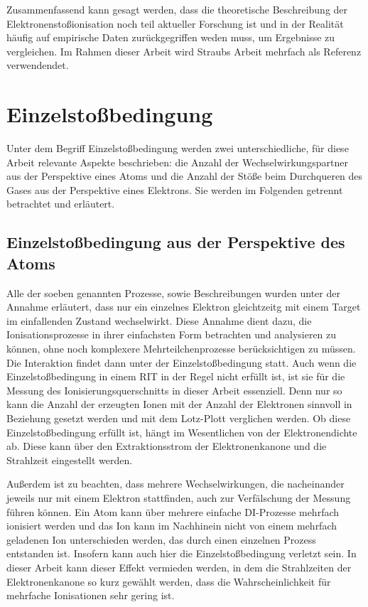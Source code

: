 Zusammenfassend kann gesagt werden, dass die theoretische Beschreibung der Elektronenstoßionisation noch teil aktueller Forschung ist und in der Realität häufig auf empirische Daten zurückgegriffen weden muss, um Ergebnisse zu vergleichen. Im Rahmen dieser Arbeit wird Straubs Arbeit \cite{Straub} mehrfach als Referenz verwendendet. 

\section{Einzelstoßbedingung}
\label{chap:Einzelstoß}
Unter dem Begriff Einzelstoßbedingung werden zwei unterschiedliche, für diese Arbeit relevante Aspekte beschrieben: die Anzahl der Wechselwirkungspartner aus der Perspektive eines Atoms und die Anzahl der Stöße beim Durchqueren des Gases aus der Perspektive eines Elektrons. Sie werden im Folgenden getrennt betrachtet und erläutert.

\subsection{Einzelstoßbedingung aus der Perspektive des Atoms}
Alle der soeben genannten Prozesse, sowie Beschreibungen wurden unter der Annahme erläutert, dass nur ein einzelnes Elektron gleichtzeitg mit einem Target im einfallenden Zustand wechselwirkt. Diese Annahme dient dazu, die Ionisationsprozesse in ihrer einfachsten Form betrachten und analysieren zu können, ohne noch komplexere Mehrteilchenprozesse berücksichtigen zu müssen. Die Interaktion findet dann unter der Einzelstoßbedingung statt. Auch wenn die Einzelstoßbedingung in einem RIT in der Regel nicht erfüllt ist, ist sie für die Messung des Ionisierungsquerschnitts in dieser Arbeit essenziell. Denn nur so kann die Anzahl der erzeugten Ionen mit der Anzahl der Elektronen sinnvoll in Beziehung gesetzt werden und mit dem Lotz-Plott verglichen werden. Ob diese Einzelstoßbedingung erfüllt ist, hängt im Wesentlichen von der Elektronendichte ab. Diese kann über den Extraktionsstrom der Elektronenkanone und die Strahlzeit eingestellt werden.

Außerdem ist zu beachten, dass mehrere Wechselwirkungen, die nacheinander jeweils nur mit einem Elektron stattfinden, auch zur Verfälschung der Messung führen können. Ein Atom kann über mehrere einfache DI-Prozesse mehrfach ionisiert werden und das Ion kann im Nachhinein nicht von einem mehrfach geladenen Ion unterschieden werden, das durch einen einzelnen Prozess entstanden ist. Insofern kann auch hier die Einzelstoßbedingung verletzt sein. In dieser Arbeit kann dieser Effekt vermieden werden, in dem die Strahlzeiten der Elektronenkanone so kurz gewählt werden, dass die Wahrscheinlichkeit für mehrfache Ionisationen sehr gering ist.

